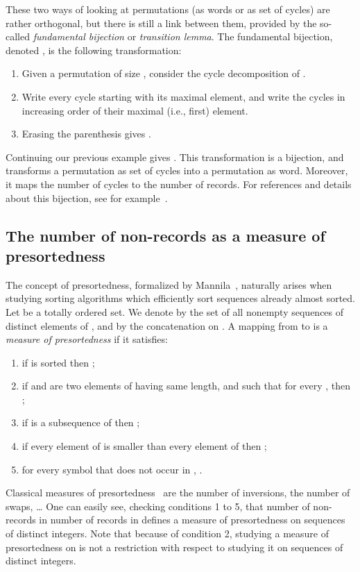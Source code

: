 \documentclass[proceedings]{aofa}
\begin{document}
These two ways of looking at permutations (as words or as set of cycles) are rather orthogonal, 
but there is still a link between them, provided by the so-called \emph{fundamental bijection} or \emph{transition lemma}. 
The fundamental bijection, denoted , is the following transformation: 
\begin{enumerate}\setlength\itemsep{-1mm}
\item Given  a permutation of size , consider the cycle decomposition of . 
\item Write every cycle starting with its maximal element, 
and write the cycles in increasing order of their maximal (i.e., first) element. 
\item Erasing the parenthesis gives . 
\end{enumerate}
Continuing our previous example gives . 
This transformation is a bijection, and transforms a permutation as set of cycles into a permutation as word. 
Moreover, it maps the number of cycles to the number of records. 
For references and details about this bijection, see for example~\cite[p. 109--110]{Bona}. 

\subsection{The number of non-records as a measure of presortedness}\label{sec:presortedness}

The concept of presortedness, formalized by Mannila~\cite{Mannila1985}, naturally arises when studying sorting algorithms which efficiently sort sequences already almost sorted. 
Let  be a totally ordered set. 
We denote by  the set of all nonempty sequences of distinct elements of , 
and by  the concatenation on . 
A mapping  from   to  is a \emph{measure of presortedness} if it satisfies:
\begin{enumerate}
\setlength\itemsep{-1mm}
\item if  is sorted then ;
\item if  and  are two elements of  having same length, and such that for every ,
 then ;
\item if  is a subsequence of  then ;
\item if every element of  is smaller than every element of  then ;
\item for every symbol  that does not occur in , .
\end{enumerate}
Classical measures of presortedness~\cite{Mannila1985} are the number of inversions, the number of swaps, \ldots 
One can easily see, checking conditions 1 to 5, that  number of non-records in  number of records in  
defines a measure of presortedness on sequences of distinct integers. 
Note that because of condition 2, studying a measure of presortedness on  is not a restriction with respect to studying it on sequences of distinct integers. 
\end{document}
